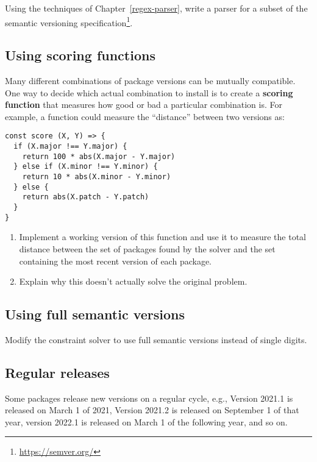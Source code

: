 \documentclass[krantzl]{krantz}
\newcommand{\chapref}[1]{Chapter~\ref{#1}}
\newcommand{\glossref}[1]{\textbf{#1}}
\newcommand{\hreffoot}[2]{{#1}\footnote{\href{#2}{#2}}}
\begin{document}
Using the techniques of \chapref{regex-parser},
write a parser for a subset of the \hreffoot{semantic versioning specification}{https://semver.org/}.

\subsection*{Using scoring functions}


Many different combinations of package versions can be mutually compatible.
One way to decide which actual combination to install
is to create a \glossref{scoring function}
that measures how good or bad a particular combination is.
For example,
a function could measure the “distance” between two versions as:

\begin{lstlisting}[frame=tblr]
const score (X, Y) => {
  if (X.major !== Y.major) {
    return 100 * abs(X.major - Y.major)
  } else if (X.minor !== Y.minor) {
    return 10 * abs(X.minor - Y.minor)
  } else {
    return abs(X.patch - Y.patch)
  }
}
\end{lstlisting}

\begin{enumerate}

\item 

Implement a working version of this function
    and use it to measure the total distance between
    the set of packages found by the solver
    and the set containing the most recent version of each package.



\item 

Explain why this doesn’t actually solve the original problem.



\end{enumerate}

\subsection*{Using full semantic versions}


Modify the constraint solver to use full semantic versions instead of single digits.

\subsection*{Regular releases}


Some packages release new versions on a regular cycle,
e.g.,
Version 2021.1 is released on March 1 of 2021,
Version 2021.2 is released on September 1 of that year,
version 2022.1 is released on March 1 of the following year,
and so on.
\end{document}
